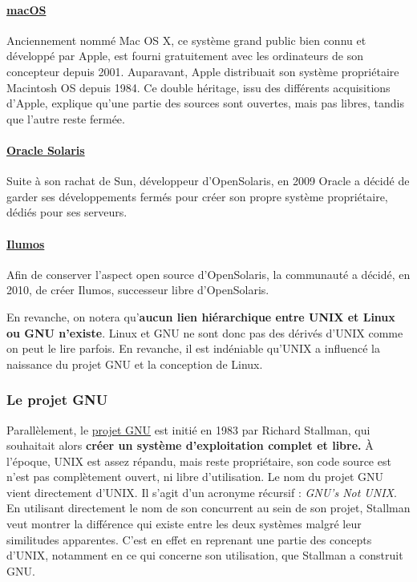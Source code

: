 \paragraph{\href{https://www.apple.com/macos}{macOS}}
Anciennement nommé Mac OS X, ce système grand public bien connu et développé par Apple, est fourni gratuitement avec les ordinateurs de son concepteur depuis 2001. Auparavant, Apple distribuait son système propriétaire Macintosh OS depuis 1984. Ce double héritage, issu des différents acquisitions d'Apple, explique qu'une partie des sources sont ouvertes, mais pas libres, tandis que l'autre reste fermée.

\paragraph{\href{http://www.oracle.com/technetwork/server-storage/solaris}{Oracle Solaris}}
Suite à son rachat de Sun, développeur d'OpenSolaris, en 2009 Oracle a décidé de garder ses développements fermés pour créer son propre système propriétaire, dédiés pour ses serveurs.

\paragraph{\href{https://www.illumos.org}{Ilumos}}
Afin de conserver l'aspect open source d'OpenSolaris, la communauté a décidé, en 2010, de créer Ilumos, successeur libre d'OpenSolaris.

En revanche, on notera qu'\textbf{aucun lien hiérarchique entre UNIX et Linux ou GNU n'existe}. Linux et GNU ne sont donc pas des dérivés d'UNIX comme on peut le lire parfois. En revanche, il est indéniable qu'UNIX a influencé la naissance du projet GNU et la conception de Linux.

\newpage

\subsubsection{Le projet GNU}
Parallèlement, le \href{https://www.gnu.org/}{projet GNU} est initié en 1983 par Richard Stallman, qui souhaitait alors \textbf{créer un système d'exploitation complet et libre.} À l'époque, UNIX est assez répandu, mais reste propriétaire, son code source est n'est pas complètement ouvert, ni libre d'utilisation.
Le nom du projet GNU vient directement d'UNIX. Il s'agit d'un acronyme récursif : \textit{GNU's Not UNIX}. En utilisant directement le nom de son concurrent au sein de son projet, Stallman veut montrer la différence qui existe entre les deux systèmes malgré leur similitudes apparentes. C'est en effet en reprenant une partie des concepts d'UNIX, notamment en ce qui concerne son utilisation, que Stallman a construit GNU.

